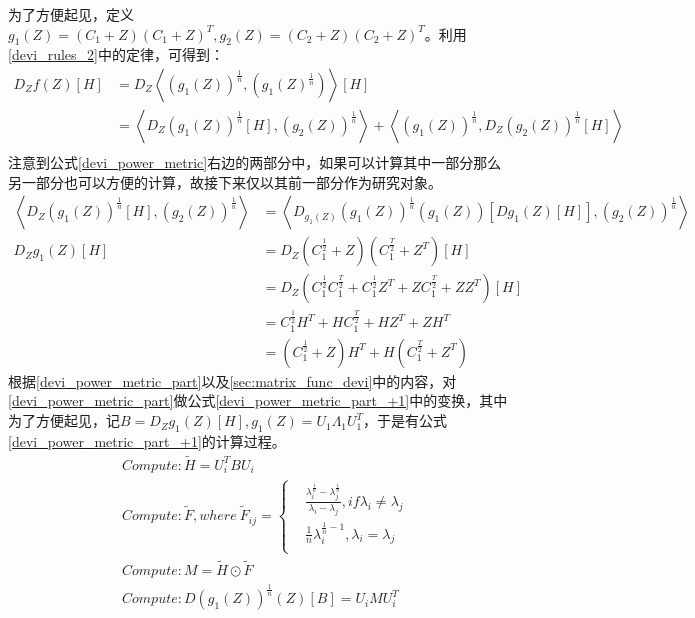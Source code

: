 为了方便起见，定义$g_{1}(Z)=(C_1+Z)(C_1+Z)^{T},g_{2}(Z)=(C_2+Z)(C_2+Z)^{T}$。利用\ref{devi_rules_2}中的定律，可得到：
\begin{equation}
\label{devi_power_metric}
\begin{split}
D_{Z}f(Z)[H]&=D_{Z}\left<\left(g_{1}(Z)\right)^{\frac{1}{n}},\left(g_{1}(Z)^{\frac{1}{n}}\right)\right>[H]\\
&=\left<D_{Z}\left(g_{1}(Z)\right)^{\frac{1}{n}}[H],\left(g_{2}(Z)\right)^{\frac{1}{n}}\right>+\left<\left(g_{1}(Z)\right)^{\frac{1}{n}},D_{Z}\left(g_{2}(Z)\right)^{\frac{1}{n}}[H]\right>\\
\end{split}
\end{equation}
注意到公式\ref{devi_power_metric}右边的两部分中，如果可以计算其中一部分那么另一部分也可以方便的计算，故接下来仅以其前一部分作为研究对象。
\begin{equation}
\label{devi_power_metric_part}
\begin{split}
\left<D_{Z}\left(g_{1}(Z)\right)^{\frac{1}{n}}[H],\left(g_{2}(Z)\right)^{\frac{1}{n}}\right>&=\left<D_{g_{1}(Z)}\left(g_{1}(Z)\right)^{\frac{1}{n}}(g_{1}(Z))[Dg_{1}(Z)[H]],\left(g_{2}(Z)\right)^{\frac{1}{n}}\right>\\
D_{Z}g_{1}(Z)[H]&=D_{Z}(C_{1}^{\frac{1}{2}}+Z)(C_{1}^{\frac{T}{2}}+Z^{T})[H]\\
&=D_{Z}(C_{1}^{\frac{1}{2}}C_{1}^{\frac{T}{2}}+C_{1}^{\frac{1}{2}}Z^{T}+ZC_{1}^{\frac{T}{2}}+ZZ^{T})[H]\\
&=C_{1}^{\frac{1}{2}}H^{T}+HC_{1}^{\frac{T}{2}}+HZ^{T}+ZH^{T}\\
&=(C_{1}^{\frac{1}{2}}+Z)H^{T}+H(C_{1}^{\frac{T}{2}}+Z^{T})
\end{split}
\end{equation}
根据\ref{devi_power_metric_part}以及\ref{sec:matrix_func_devi}中的内容，对\ref{devi_power_metric_part}做公式\ref{devi_power_metric_part_+1}中的变换，其中为了方便起见，记$B=D_{Z}g_{1}(Z)[H],g_{1}(Z)=U_{1}\Lambda_{1}U_{1}^{T}$，于是有公式\ref{devi_power_metric_part_+1}的计算过程。
\begin{equation}
\label{devi_power_metric_part_+1}
\begin{split}
&Compute:\tilde{H}=U_{i}^{T}BU_{i}\\
&Compute:\tilde{F},where~\tilde{F}_{ij}=\left\{
\begin{split}
&\frac{\lambda_{i}^{\frac{1}{n}}-\lambda_{j}^{\frac{1}{n}}}{\lambda_{i}-\lambda_{j}},if \lambda_{i}\neq \lambda_{j}\\
&\frac{1}{n}\lambda_{i}^{\frac{1}{n}-1},\lambda_{i}=\lambda_{j}\\
\end{split}
\right.\\
&Compute:M=\tilde{H}\odot\tilde{F}\\
&Compute:D\left(g_{1}(Z)\right)^{\frac{1}{n}}(Z)[B]=U_{i}MU_{i}^{T}
\end{split}
\end{equation}
